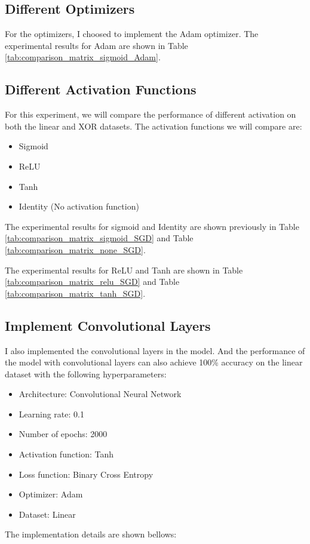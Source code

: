 \subsection{Different Optimizers}


For the optimizers, I choosed to implement the Adam optimizer.
The experimental results for Adam are shown in Table \ref{tab:comparison_matrix_sigmoid_Adam}.


\subsection{Different Activation Functions}

For this experiment, we will compare the performance of different activation on both the linear and XOR datasets.
The activation functions we will compare are:
\begin{itemize}
    \item Sigmoid
    \item ReLU
    \item Tanh
    \item Identity (No activation function)
\end{itemize}

The experimental results for sigmoid and Identity are shown previously in Table \ref{tab:comparison_matrix_sigmoid_SGD} and Table \ref{tab:comparison_matrix_none_SGD}.

The experimental results for ReLU and Tanh are shown in Table \ref{tab:comparison_matrix_relu_SGD} and Table \ref{tab:comparison_matrix_tanh_SGD}.


\subsection{Implement Convolutional Layers}

I also implemented the convolutional layers in the model.
And the performance of the model with convolutional layers can also achieve 100\% accuracy on the linear dataset with the following hyperparameters:

\begin{itemize}
    \item Architecture: Convolutional Neural Network
    \item Learning rate: 0.1
    \item Number of epochs: 2000
    \item Activation function: Tanh
    \item Loss function: Binary Cross Entropy
    \item Optimizer: Adam
    \item Dataset: Linear
\end{itemize}

The implementation details are shown bellows:

\inputminted[firstline=41,lastline=62]{python}{../model.py}
